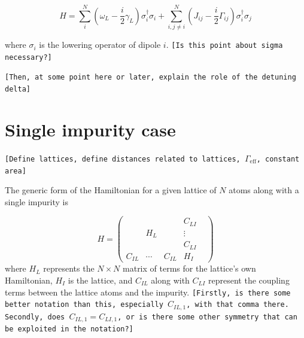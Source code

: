 \documentclass[aps,pra,superscriptaddress,twocolumn]{revtex4-1}
\newcommand{\commentSB}[1]{\texttt{\color{blue}[#1]}}
\newcommand{\commentSO}[1]{\texttt{\color{orange}[#1]}}
\begin{document}
\begin{equation}   
    H = \sum_i^N \left( \omega_L - \frac{i}{2} \gamma_L \right) \sigma_i^\dag \sigma_i + \sum_{i,j \neq i}^N \left( J_{ij} - \frac{i}{2} \Gamma_{ij} \right) \sigma_i^\dag \sigma_j 
    \label{eqn:Hamiltonian}
\end{equation}

where $\sigma_i$ is the lowering operator of dipole $i$. 
\commentSB{Is this point about sigma necessary?}

\commentSB{Then, at some point here or later, explain the role of the detuning delta}

\section{Single impurity case}
\commentSO{Define lattices, define distances related to lattices, $\Gamma_\mathrm{eff}$, constant area}


The generic form of the Hamiltonian for a given lattice of $N$ atoms along with a single impurity is 

\begin{equation}
    H = \begin{pmatrix}
        ~ & ~ & ~ &   C_{LI} \\ 
        ~ & H_L & ~ & \vdots \\
        ~ & ~ & ~ & C_{LI} & \\
        C_{IL} & \cdots & C_{IL} & H_I   
    \end{pmatrix}
    \label{eqn:blockH1}
\end{equation}
where $H_L$ represents the $N \times N$ matrix of terms for the lattice's own Hamiltonian, $H_I$ is the lattice, and $C_{IL}$ along with $C_{LI}$ represent the coupling terms between the lattice atoms and the impurity. 
\commentSB{Firstly, is there some better notation than this, especially $C_{IL,1}$, with that comma there. Secondly, does $C_{IL,1} = C_{LI,1}$, or is there some other symmetry that can be exploited in the notation?}
\end{document}
